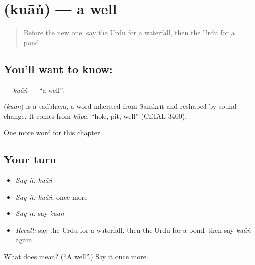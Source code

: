 \section[\texorpdfstring{\ur{کنواں} (kuāṅ)}{کنواں (kuāṅ)}]{ (kuāṅ) — a well}

\label{lesson:UR-C124-kuan}



\begin{quote}
Before the new one: say the Urdu for a waterfall, then the Urdu for a pond.
\end{quote}

\subsection*{You'll want to know: }
\textbf{} — \emph{kuāṅ} — \textquotedblleft{}a well\textquotedblright{}.

\begin{cousinweb}
\textbf{} (\emph{kuāṅ}) is a tadbhava, a word inherited from Sanskrit and reshaped by sound change. It comes from \emph{kūpa}, \textquotedblleft{}hole, pit, well\textquotedblright{} (CDIAL 3400).
\end{cousinweb}

\begin{grammarlens}[title={What you've built}]
One more word for this chapter.
\end{grammarlens}

\subsection*{Your turn}
\begin{itemize}
\raggedright
  \item \emph{Say it:} \emph{kuāṅ}
  \item \emph{Say it:} \emph{kuāṅ}, once more
  \item \emph{Say it:} say \emph{kuāṅ}
  \item \emph{Recall:} say the Urdu for a waterfall, then the Urdu for a pond, then say \emph{kuāṅ} again
\end{itemize}

\begin{tcolorbox}[breakable,colback=teal!4,colframe=teal!35!black,title={Before you move on}]
What does  mean? (\textquotedblleft{}A well\textquotedblright{}.) Say it once more.
\end{tcolorbox}

